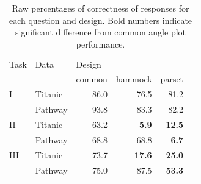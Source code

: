 \begin{table}[ht]
\begin{center}
\begin{tabular}{llrrrr}
  \hline
Task & Data & \multicolumn{3}{l}{Design} \\
& & common & hammock & parset \\ 
  \hline
 I & Titanic & 86.0 & 76.5 & 81.2 \\ 
 & Pathway & 93.8 & 83.3 & 82.2 \\ [3pt]
 II & Titanic  & 63.2 & {\bf 5.9} & {\bf 12.5} \\ 
 & Pathway  & 68.8 & 68.8 & {\bf 6.7} \\ [3pt]
 III & Titanic  & 73.7 & {\bf 17.6} & {\bf 25.0} \\ 
 & Pathway  & 75.0 & 87.5 & {\bf 53.3} \\
   \hline
\end{tabular}
\end{center}
\caption{\label{raw} Raw percentages of correctness of responses for each question and design. Bold numbers indicate significant difference from common angle plot performance. }
\end{table}

